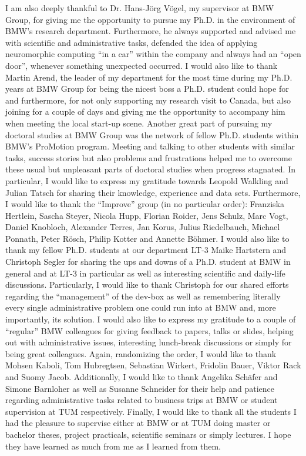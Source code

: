 I am also deeply thankful to Dr. Hans-J\"org V\"ogel, my supervisor at BMW Group, for giving me the opportunity to pursue my Ph.D. in the environment of BMW's research department.
Furthermore, he always supported and advised me with scientific and administrative tasks, defended the idea of applying neuromorphic computing \enquote{in a car} within the company and always had an \enquote{open door}, whenever something unexpected occurred.
I would also like to thank Martin Arend, the leader of my department for the most time during my Ph.D. years at BMW Group for being the nicest boss a Ph.D. student could hope for and furthermore, for not only supporting my research visit to Canada, but also joining for a couple of days and giving me the opportunity to accompany him when meeting the local start-up scene.
Another great part of pursuing my doctoral studies at BMW Group was the network of fellow Ph.D. students within BMW's ProMotion program.
Meeting and talking to other students with similar tasks, success stories but also problems and frustrations helped me to overcome these usual but unpleasant parts of doctoral studies when progress stagnated.
In particular, I would like to express my gratitude towards Leopold Walkling and Julian Tatsch for sharing their knowledge, experience and data sets.
Furthermore, I would like to thank the \enquote{Improve} group (in no particular order): Franziska Hertlein, Sascha Steyer, Nicola Hupp, Florian Roider, Jens Schulz, Marc Vogt, Daniel Knobloch, Alexander Terres, Jan Korus, Julius Riedelbauch, Michael Ponnath, Peter R\"osch, Philip Kotter and Annette B\"ohmer.
I would also like to thank my fellow Ph.D. students at our department LT-3 Maike Hartstern and Christoph Segler for sharing the ups and downs of a Ph.D. student at BMW in general and at LT-3 in particular as well as interesting scientific and daily-life discussions.
Particularly, I would like to thank Christoph for our shared efforts regarding the \enquote{management} of the dev-box as well as remembering literally every single administrative problem one could run into at BMW and, more importantly, its solution.
I would also like to express my gratitude to a couple of \enquote{regular} BMW colleagues for giving feedback to papers, talks or slides, helping out with administrative issues, interesting lunch-break discussions or simply for being great colleagues.
Again, randomizing the order, I would like to thank Mohsen Kaboli, Tom Hubregtsen, Sebastian Wirkert, Fridolin Bauer, Viktor Rack and Suomy Jacob. 
Additionally, I would like to thank Angelika Sch\"afer and Simone Barnloher as well as Susanne Schneider for their help and patience regarding administrative tasks related to business trips at BMW or student supervision at TUM respectively.
Finally, I would like to thank all the students I had the pleasure to supervise either at BMW or at TUM doing master or bachelor theses, project practicals, scientific seminars or simply lectures.
I hope they have learned as much from me as I learned from them.

